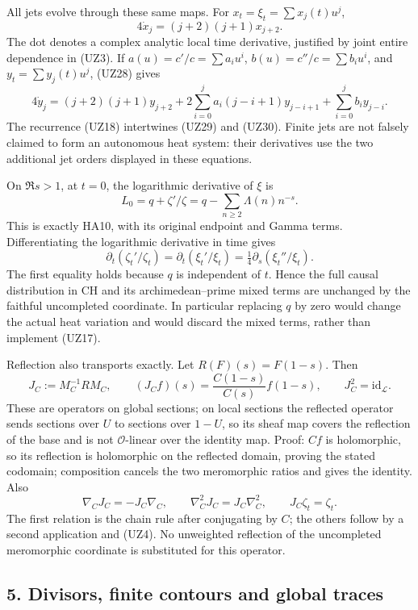 \documentclass[
  10pt,
  a4paper,
]{article}
\begin{document}
All jets evolve through these same maps. For
\(x_t=\xi_t=\sum x_j(t)u^j\), \[
4\dot x_j=(j+2)(j+1)x_{j+2}.
\tag{UZ29}
\] The dot denotes a complex analytic local time derivative, justified
by joint entire dependence in (UZ3). If \(a(u)=c'/c=\sum a_i u^i\),
\(b(u)=c''/c=\sum b_i u^i\), and \(y_t=\sum y_j(t)u^j\), (UZ28) gives \[
4\dot y_j=(j+2)(j+1)y_{j+2}
+2\sum_{i=0}^j a_i(j-i+1)y_{j-i+1}
+\sum_{i=0}^j b_i y_{j-i}.
\tag{UZ30}
\] The recurrence (UZ18) intertwines (UZ29) and (UZ30). Finite jets are
not falsely claimed to form an autonomous heat system: their derivatives
use the two additional jet orders displayed in these equations.

On \(\Re s>1\), at \(t=0\), the logarithmic derivative of \(\xi\) is \[
L_0=q+\zeta'/\zeta
=q-\sum_{n\ge2}\Lambda(n)n^{-s}.
\tag{UZ31}
\] This is exactly HA10, with its original endpoint and Gamma terms.
Differentiating the logarithmic derivative in time gives \[
\partial_t(\zeta_t'/\zeta_t)
=\partial_t(\xi_t'/\xi_t)
=\tfrac14\partial_s(\xi_t''/\xi_t).
\tag{UZ32}
\] The first equality holds because \(q\) is independent of \(t\). Hence
the full causal distribution in CH and its archimedean--prime mixed
terms are unchanged by the faithful uncompleted coordinate. In
particular replacing \(q\) by zero would change the actual heat
variation and would discard the mixed terms, rather than implement
(UZ17).

Reflection also transports exactly. Let \(R(F)(s)=F(1-s)\). Then \[
J_C:=M_C^{-1}RM_C,\qquad
(J_C f)(s)=\frac{C(1-s)}{C(s)}f(1-s),\qquad
J_C^2=\mathrm{id}_{\mathcal L}.
\tag{UZ33}
\] These are operators on global sections; on local sections the
reflected operator sends sections over \(U\) to sections over \(1-U\),
so its sheaf map covers the reflection of the base and is not
\(\mathcal O\)-linear over the identity map. Proof: \(Cf\) is
holomorphic, so its reflection is holomorphic on the reflected domain,
proving the stated codomain; composition cancels the two meromorphic
ratios and gives the identity. Also \[
\nabla_C J_C=-J_C\nabla_C,\qquad
\nabla_C^2J_C=J_C\nabla_C^2,\qquad
J_C\zeta_t=\zeta_t.
\tag{UZ34}
\] The first relation is the chain rule after conjugating by \(C\); the
others follow by a second application and (UZ4). No unweighted
reflection of the uncompleted meromorphic coordinate is substituted for
this operator.

\subsection{5. Divisors, finite contours and global
traces}\label{divisors-finite-contours-and-global-traces}
\end{document}
